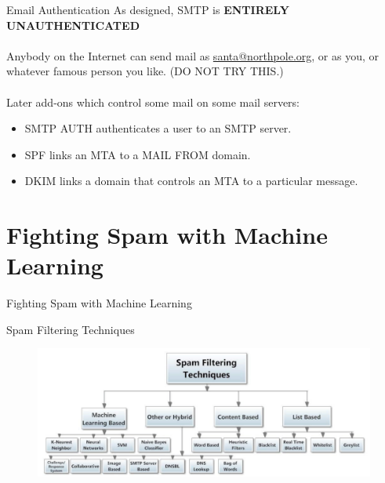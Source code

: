 \documentclass[nobackground,dvipsnames,table]{beamer}
\begin{document}
\begin{frame}{Email Authentication}
    As designed, SMTP is \textbf{ENTIRELY UNAUTHENTICATED}\\~\\
    Anybody on the Internet can send mail as \url{santa@northpole.org}, or as you, or whatever famous person you like. (DO NOT TRY THIS.)\\~\\
    
    Later add-ons which control some mail on some mail servers:
    \begin{itemize}
        \item SMTP AUTH authenticates a user to an SMTP server.
        \item SPF links an MTA to a MAIL FROM domain.
        \item DKIM links a domain that controls an MTA to a particular message.
    \end{itemize}
\end{frame}

\section{Fighting Spam with Machine Learning}

\begin{frame}{} %
    Fighting Spam with Machine Learning
\end{frame}

\begin{frame}{Spam Filtering Techniques}
    \begin{figure}
        \centering
        \includegraphics[width=\textwidth]{spam-filtering-techniques}
    \end{figure}
\end{frame}
\end{document}
